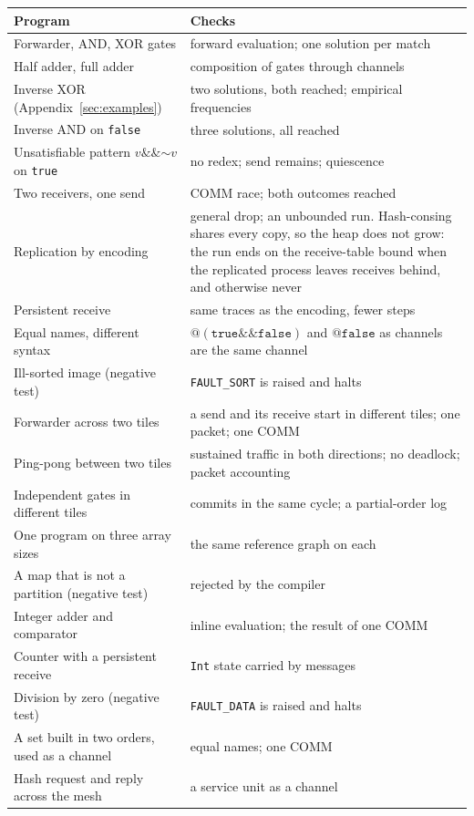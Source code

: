 \documentclass[10.5pt,a4paper]{extarticle}
\makeatletter
\newcommand{\kw}[1]{\texttt{#1}}
\newcommand{\tru}{\kw{true}}
\newcommand{\fls}{\kw{false}}
\newcommand{\bnot}{\mathord{\sim}}
\newcommand{\band}{\mathbin{\&\&}}
\newcommand{\quo}[1]{@#1}
\theoremstyle{definition}
\theoremstyle{remark}
\makeatother
\begin{document}
\noindent
\begin{tabularx}{\textwidth}{@{}l X@{}}
\toprule
Program & Checks\\
\midrule
Forwarder, AND, XOR gates & forward evaluation; one solution per match\\
Half adder, full adder & composition of gates through channels\\
Inverse XOR (Appendix~\ref{sec:examples}) & two solutions, both reached;
  empirical frequencies\\
Inverse AND on \fls & three solutions, all reached\\
Unsatisfiable pattern $v \band \bnot v$ on \tru & no redex; send remains;
  quiescence\\
Two receivers, one send & COMM race; both outcomes reached\\
Replication by encoding & general drop; an unbounded run. Hash-consing shares
  every copy, so the heap does not grow: the run ends on the receive-table
  bound when the replicated process leaves receives behind, and otherwise
  never\\
Persistent receive & same traces as the encoding, fewer steps\\
Equal names, different syntax & $\quo{(\tru \band \fls)}$ and $\quo{\fls}$
  as channels are the same channel\\
Ill-sorted image (negative test) & \kw{FAULT\_SORT} is raised and halts\\
Forwarder across two tiles & a send and its receive start in different
  tiles; one packet; one COMM\\
Ping-pong between two tiles & sustained traffic in both directions; no
  deadlock; packet accounting\\
Independent gates in different tiles & commits in the same cycle; a partial-order log\\
One program on three array sizes & the same reference graph on each\\
A map that is not a partition (negative test) & rejected by the compiler\\
Integer adder and comparator & inline evaluation; the result of one COMM\\
Counter with a persistent receive & \kw{Int} state carried by messages\\
Division by zero (negative test) & \kw{FAULT\_DATA} is raised and halts\\
A set built in two orders, used as a channel & equal names; one COMM\\
Hash request and reply across the mesh & a service unit as a channel\\
\bottomrule
\end{tabularx}
\end{document}
